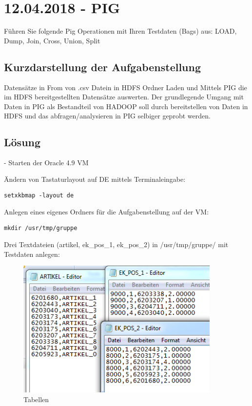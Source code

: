 \section{12.04.2018 - PIG}
Führen Sie folgende Pig Operationen mit Ihren Testdaten (Bags) aus: LOAD,  Dump, Join, Cross, Union, Split

\subsection{Kurzdarstellung der Aufgabenstellung}
Datensätze in From von .csv Datein in HDFS Ordner Laden und Mittels PIG die im HDFS bereitgestellten Datensätze auswerten. Der grundlegende Umgang mit Daten in PIG als Bestandteil von HADOOP soll durch bereitstellen von Daten in HDFS und das abfragen/analysieren in PIG selbiger geprobt werden.
\subsection{Lösung}
- Starten der Oracle 4.9 VM

Ändern von Tastaturlayout auf DE mittels Terminaleingabe:
\begin{lstlisting}
setxkbmap -layout de
\end{lstlisting}

Anlegen eines eigenes Ordners für die Aufgabenstellung auf der VM:
\begin{lstlisting}
mkdir /usr/tmp/gruppe
\end{lstlisting}

Drei Textdateien (artikel, ek\_pos\_1, ek\_pos\_2) in /usr/tmp/gruppe/ mit Testdaten anlegen:
\begin{figure}[!htb]
        \begin{minipage}{1\textwidth}
                \centering
                \includegraphics[width=0.90\textwidth]{pics/pig1.png}\par\vspace{0cm}
                \caption{Tabellen}
                \label{fig:pig1}
        \end{minipage}
\end{figure}

